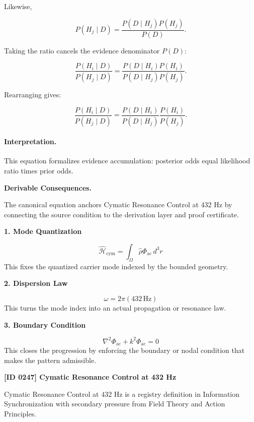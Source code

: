Likewise,

\begin{equation}
P(H_j\mid D)
=
\frac{P(D\mid H_j)P(H_j)}
{P(D)} .
\end{equation}

Taking the ratio cancels the evidence denominator $P(D)$:

\begin{equation}
\frac{P(H_i\mid D)}
{P(H_j\mid D)}
=
\frac{P(D\mid H_i)P(H_i)}
{P(D\mid H_j)P(H_j)} .
\end{equation}

Rearranging gives:

\begin{equation}
\boxed{
\frac{P(H_i\mid D)}
{P(H_j\mid D)}
=
\frac{P(D\mid H_i)}
{P(D\mid H_j)}
\frac{P(H_i)}
{P(H_j)} .
}
\end{equation}

\paragraph{Interpretation.}
This equation formalizes evidence accumulation: posterior odds equal likelihood ratio times prior odds.

\par\vspace{0.35em}
\noindent\textbf{Derivable Consequences.}\quad
\begingroup
\footnotesize
\raggedright
The canonical equation anchors Cymatic Resonance Control at 432 Hz by connecting the source condition to the derivation layer and proof certificate.
\par\endgroup

\noindent\textbf{1. Mode Quantization}\par
\[
\hat{\mathcal{H}}_{\mathrm{cym}}=\int_{\Omega}\hat{\rho}\Phi_{\mathrm{ac}}\,d^3r
\]
\noindent This fixes the quantized carrier mode indexed by the bounded geometry.\par
\noindent\textbf{2. Dispersion Law}\par
\[
\omega=2\pi(432\,\mathrm{Hz})
\]
\noindent This turns the mode index into an actual propagation or resonance law.\par
\noindent\textbf{3. Boundary Condition}\par
\[
\nabla^2\Phi_{\mathrm{ac}}+k^2\Phi_{\mathrm{ac}}=0
\]
\noindent This closes the progression by enforcing the boundary or nodal condition that makes the pattern admissible.\par

\clearpage
\noindent\textbf{[ID 0247] Cymatic Resonance Control at 432 Hz}\par
\vspace{0.35em}
\begingroup\small
{}
Cymatic Resonance Control at 432 Hz is a registry definition in Information Synchronization with secondary pressure from Field Theory and Action Principles.

